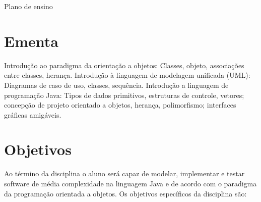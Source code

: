 \documentclass[11pt]{../classes/ifscarticle}
\begin{document}
\begin{center}
	{\huge Plano de ensino}\vspace*{.5cm}
\end{center}

\noindent{}\vspace*{.5cm}

\section{Ementa}

Introdução ao paradigma da orientação a objetos: Classes, objeto, associações entre classes, herança. Introdução à linguagem de modelagem unificada (UML): Diagramas de caso de uso, classes, sequência. Introdução a linguagem de programação Java: Tipos de dados primitivos, estruturas de controle, vetores; concepção de projeto orientado a objetos, herança, polimorfismo; interfaces gráficas amigáveis.

\section{Objetivos}

Ao término da disciplina o aluno será capaz de modelar, implementar e testar software de média complexidade na linguagem Java e de acordo com o paradigma da programação orientada a objetos. Os objetivos específicos da disciplina são:
\end{document}
